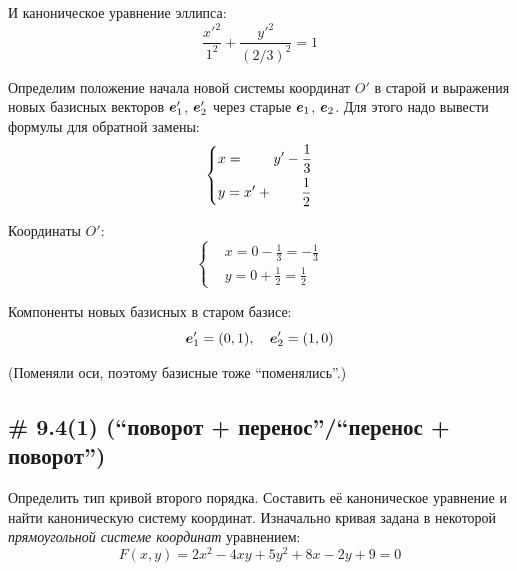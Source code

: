 \documentclass[a4paper,12pt]{article}
\begin{document}
\begin{solution}
    И каноническое уравнение эллипса:
    \[
      \frac{x'^2}{1^2} + \frac{y'^2}{(2/3)^2} = 1
    \]
    
    Определим положение начала новой системы координат $O'$ в старой и выражения новых базисных векторов $\boldsymbol e_1'$, $\boldsymbol e_2'$ через старые $\boldsymbol e_1$, $\boldsymbol e_2$.
    Для этого надо вывести формулы для обратной замены:
    \[
      \left\{
        \begin{aligned}
          &x = \hphantom{x' + {}} y' - \frac{1}{3}\\
          &y = x' + \hphantom{y' + {}} \frac{1}{2}
        \end{aligned}
      \right.
    \]
    
    Координаты $O'$:
    \[
      \left\{
        \begin{aligned}
          &x = 0 - \frac{1}{3} = -\frac{1}{3}\\
          &y = 0 + \frac{1}{2} = \frac{1}{2}
        \end{aligned}
      \right.
    \]
    
    Компоненты новых базисных в старом базисе:
    \[
      \boldsymbol e_1' = (0, 1),\quad \boldsymbol e_2' = (1, 0)
    \]
    
    (Поменяли оси, поэтому базисные тоже ``поменялись''.)
  \end{solution}


  \subsection{\# 9.4(1) (``поворот + перенос''/``перенос + поворот'')}
  
  Определить тип кривой второго порядка.
  Составить её каноническое уравнение и найти каноническую систему координат.
  Изначально кривая задана в некоторой \emph{прямоугольной системе координат} уравнением:
  \begin{equation}\label{eq:problem-9-4}
    F(x, y) = 2x^2 - 4xy + 5y^2 + 8x - 2y + 9 = 0
  \end{equation}
  
\end{document}
